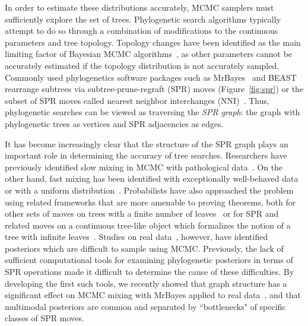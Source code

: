 \documentclass[]{elsarticle}
\begin{document}
In order to estimate these distributions accurately, MCMC samplers must sufficiently explore the set of trees.
Phylogenetic search algorithms typically attempt to do so through a combination of modifications to the continuous parameters and tree topology.
Topology changes have been identified as the main limiting factor of Bayesian MCMC algorithms~\citep{lakner2008efficiency,hohna2012guided}, as other parameters cannot be accurately estimated if the topology distribution is not accurately sampled.
Commonly used phylogenetics software packages such as MrBayes~\citep{Ronquist2012-hi} and BEAST~\citep{bouckaert2014beast} rearrange subtrees via subtree-prune-regraft (SPR) moves (Figure~\ref{fig:spr}) or the subset of SPR moves called nearest neighbor interchanges (NNI)~\citep{robinson1971comparison}.
Thus, phylogenetic searches can be viewed as traversing the \emph{SPR graph}: the graph with phylogenetic trees as vertices and SPR adjacencies as edges.

It has become increasingly clear that the structure of the SPR graph plays an important role in determining the accuracy of tree searches.
Researchers have previously identified slow mixing in MCMC with pathological data~\citep{Mossel2005-ly,Mossel2006-fo,Ronquist2006-fv}.
On the other hand, fast mixing has been identified with exceptionally well-behaved data~\citep{Stefankovic2011-hu} or with a uniform distribution~\citep{spade2014note}.
 Probabilists have also approached the problem using related frameworks that are more amenable to proving theorems, both for other sets of moves on trees with a finite number of leaves~\citep{Aldous2000-vg,Diaconis2002-gy} or for SPR and related moves on a continuous tree-like object which formalizes the notion of a tree with infinite leaves~\citep{Evans2006-xh,Athreya2014-de}.
Studies on real data~\citep{beiko2006searching, lakner2008efficiency}, however, have identified posteriors which are difficult to sample using MCMC.
Previously, the lack of sufficient computational tools for examining phylogenetic posteriors in terms of SPR operations made it difficult to determine the cause of these difficulties.
By developing the first such tools, we recently showed that graph structure has a significant effect on MCMC mixing with MrBayes applied to real data~\citep{Whidden2015-yi}, and that multimodal posteriors are common and separated by ``bottlenecks" of specific classes of SPR moves.
\end{document}
